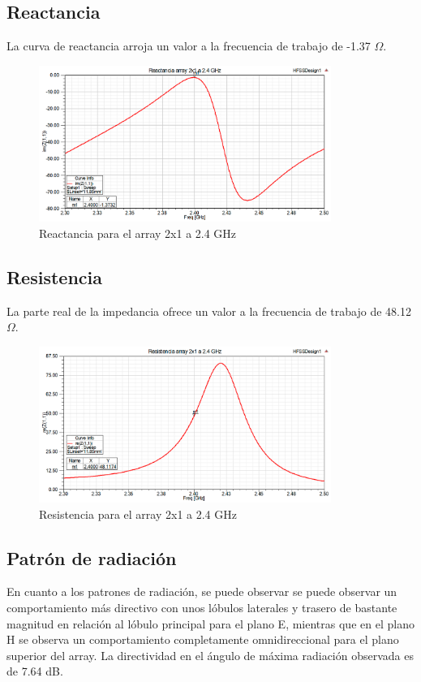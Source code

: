 \subsection{Reactancia}
\par La curva de reactancia arroja un valor a la frecuencia de trabajo de -1.37 $\Omega$. 
\\
\begin{figure}[H]
    \centering
        \includegraphics[width=0.85\textwidth]{archivos/analisis/2x11/2}
        \caption{Reactancia para el array 2x1 a 2.4 GHz}
        \label{fig:react2x11}
\end{figure}

\subsection{Resistencia}
\par La parte real de la impedancia ofrece un valor a la frecuencia de trabajo de 48.12 $\Omega$.
\\
\begin{figure}[H]
    \centering
        \includegraphics[width=0.85\textwidth]{archivos/analisis/2x11/3}
        \caption{Resistencia para el array 2x1 a 2.4 GHz}
        \label{fig:resis2x11}
\end{figure}

\subsection{Patrón de radiación}
\par En cuanto a los patrones de radiación, se puede observar se puede observar un comportamiento más directivo con unos lóbulos laterales y trasero de bastante magnitud en relación al lóbulo principal para el plano E, mientras que en el plano H se observa un comportamiento completamente omnidireccional para el plano superior del array. La directividad en el ángulo de máxima radiación observada es de 7.64 dB.
\\
